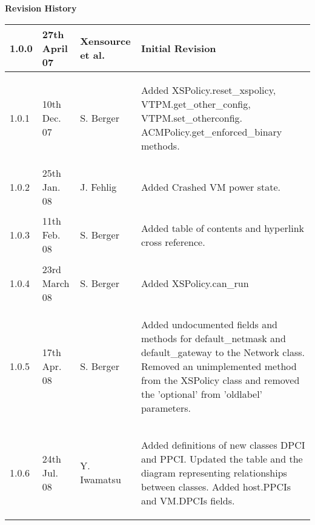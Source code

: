 { \bf Revision History}

\begin{center}
 \begin{tabular}{|l|l|l|l|}
  \hline
  1.0.0 & 27th April 07 & Xensource et al. &
   \begin{minipage}[t][.7cm]{7cm}
     Initial Revision
   \end{minipage}\\
  \hline
  1.0.1 & 10th Dec. 07 & S. Berger &
   \begin{minipage}[t]{7cm}
    \begin{flushleft}
     Added XSPolicy.reset\_xspolicy, VTPM.get\_other\_config,
     VTPM.set\_otherconfig. ACMPolicy.get\_enforced\_binary methods.
    \end{flushleft}
   \end{minipage}\\
  \hline
  1.0.2 & 25th Jan. 08 & J. Fehlig &
   \begin{minipage}[t]{7cm}
    \begin{flushleft}
     Added Crashed VM power state.
    \end{flushleft}
   \end{minipage}\\
  \hline
  1.0.3 & 11th Feb. 08 & S. Berger &
   \begin{minipage}[t]{7cm}
    \begin{flushleft}
     Added table of contents and hyperlink cross reference.
    \end{flushleft}
   \end{minipage}\\
  \hline
  1.0.4 & 23rd March 08 & S. Berger &
   \begin{minipage}[t]{7cm}
    \begin{flushleft}
     Added XSPolicy.can\_run
    \end{flushleft}
   \end{minipage}\\
  \hline
  1.0.5 & 17th Apr. 08 & S. Berger &
   \begin{minipage}[t]{7cm}
    \begin{flushleft}
     Added undocumented fields and methods for default\_netmask and
     default\_gateway to the Network class. Removed an unimplemented
     method from the XSPolicy class and removed the 'optional' from
     'oldlabel' parameters.
    \end{flushleft}
   \end{minipage}\\
  \hline
  1.0.6 & 24th Jul. 08 & Y. Iwamatsu &
   \begin{minipage}[t]{7cm}
    \begin{flushleft}
     Added definitions of new classes DPCI and PPCI. Updated the table
     and the diagram representing relationships between classes.
     Added host.PPCIs and VM.DPCIs fields.
    \end{flushleft}
   \end{minipage}\\
  \hline
 \end{tabular}
\end{center}
